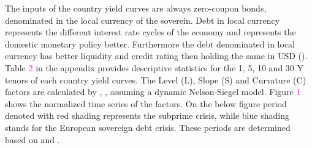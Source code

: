 \documentclass[12pt,bibliography=totoc]{article}
\begin{document}
The inputs of the country yield curves are always zero-coupon bonds, denominated in the local currency of the soverein. Debt in local currency represents the different interest rate cycles of the economy and represents the domestic monetary policy better. Furthermore the debt denominated in local currency has better liquidity and credit rating then holding the same in USD  (\cite{sowmya2016linkages}). Table \textcolor{magenta}{2} in the appendix provides descriptive statistics for the 1, 5, 10 and 30 Y tenors of each country yield curves. The Level (L), Slope (S) and Curvature (C) factors are calculated by \cite{diebold2006forecasting}, \cite{diebold2008global}, assuming a dynamic Nelson-Siegel model. Figure \textcolor{magenta}{1} shows the normalized time series of the factors.  On the below figure period denoted with red shading represents the subprime crisis, while blue shading stands for the European sovereign debt crisis. These periods are determined based on \cite{bostanci2020connected} and \cite{hue2019measuring}.

\end{document}
